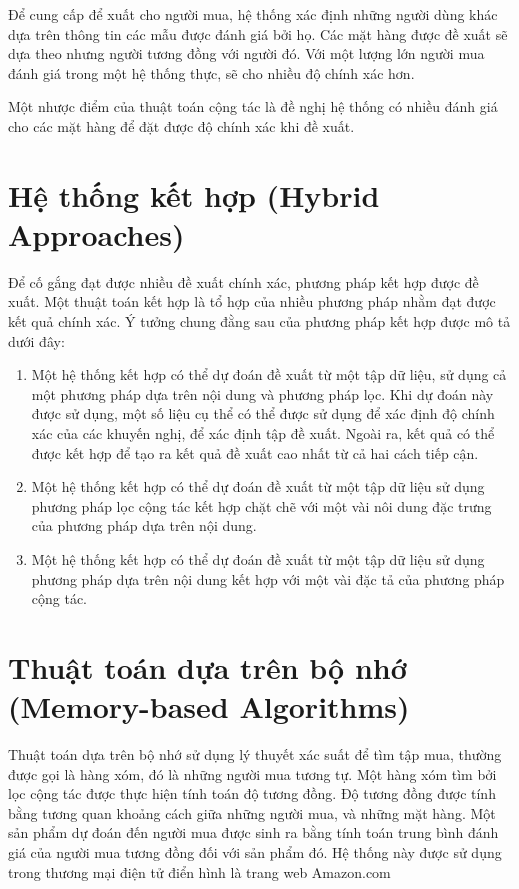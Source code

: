 Để cung cấp để xuất cho người mua, hệ thống xác định những người dùng khác dựa trên thông tin các mẫu được đánh giá bởi họ. Các mặt hàng được đề xuất sẽ dựa theo nhưng người tương đồng với người đó. Với một lượng lớn người mua đánh giá trong một hệ thống thực, sẽ cho nhiều độ chính xác hơn.

Một nhược điểm của thuật toán cộng tác là đề nghị hệ thống có nhiều đánh giá cho các mặt hàng để đặt được độ chính xác khi đề xuất.

\section{Hệ thống kết hợp (Hybrid Approaches)}
Để cố gắng đạt được nhiều đề xuất chính xác, phương pháp kết hợp được đề xuất. Một thuật toán kết hợp là tổ hợp của nhiều phương pháp nhằm đạt được kết quả chính xác. Ý tưởng chung đằng sau của phương pháp kết hợp được mô tả dưới đây:
\begin{enumerate}[1.]
	\item Một hệ thống kết hợp có thể dự đoán đề xuất từ một tập dữ liệu, sử dụng cả một phương pháp dựa trên nội dung và phương pháp lọc. Khi dự đoán này được sử dụng, một số liệu cụ thể có thể được sử dụng để xác định độ chính xác của các khuyến nghị, để xác định tập đề xuất. Ngoài ra, kết quả có thể được kết hợp để tạo ra kết quả đề xuất cao nhất từ cả hai cách tiếp cận.
	\item Một hệ thống kết hợp có thể dự đoán đề xuất từ một tập dữ liệu sử dụng phương pháp lọc cộng tác kết hợp chặt chẽ với một vài nôi dung đặc trưng của phương pháp dựa trên nội dung.
	\item Một hệ thống kết hợp có thể dự đoán đề xuất từ một tập dữ liệu sử dụng phương pháp dựa trên nội dung kết hợp với một vài đặc tả của phương pháp cộng tác.
\end{enumerate}

\section{Thuật toán dựa trên bộ nhớ (Memory-based Algorithms)}
Thuật toán dựa trên bộ nhớ sử dụng lý thuyết xác suất để tìm tập mua,  thường được gọi là hàng xóm, đó là những người mua tương tự. Một hàng xóm tìm bởi lọc cộng tác được thực hiện tính toán độ tương đồng. Độ tương đồng được tính bằng tương quan khoảng cách giữa những người mua, và những mặt hàng. Một sản phẩm dự đoán đến người mua được sinh ra bằng tính toán  trung bình đánh giá của người mua tương đồng đối với sản phẩm đó. Hệ thống này được sử dụng trong thương mại điện tử điển hình là trang web Amazon.com 

